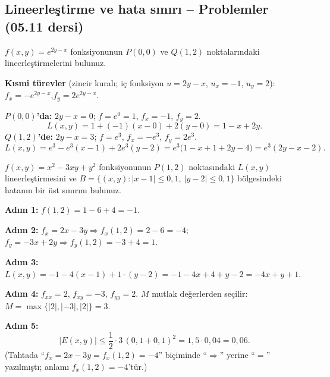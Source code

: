 \subsection{Lineerleştirme ve hata sınırı -- Problemler (05.11 dersi)}

\begin{soru}
$f(x,y)=e^{2y-x}$ fonksiyonunun $P(0,0)$ ve $Q(1,2)$ noktalarındaki lineerleştirmelerini bulunuz.
\end{soru}
\begin{cevap}
\textbf{Kısmi türevler} (zincir kuralı; iç fonksiyon $u=2y-x$, $u_x=-1$, $u_y=2$):
$f_x=-e^{2y-x}$,\quad $f_y=2e^{2y-x}$.

\textbf{$P(0,0)$'da:} $2y-x=0$; $f=e^0=1$, $f_x=-1$, $f_y=2$.
\[ L(x,y)=1+(-1)(x-0)+2(y-0)=1-x+2y . \]
\textbf{$Q(1,2)$'de:} $2y-x=3$; $f=e^3$, $f_x=-e^3$, $f_y=2e^3$.
\[ L(x,y)=e^3-e^3(x-1)+2e^3(y-2)=e^3\big(1-x+1+2y-4\big)=e^3(2y-x-2). \]
\end{cevap}

\begin{soru}
$f(x,y)=x^2-3xy+y^2$ fonksiyonunun $P(1,2)$ noktasındaki $L(x,y)$ lineerleştirmesini ve
$B=\{(x,y):|x-1|\le0{,}1,\ |y-2|\le0{,}1\}$ bölgesindeki hatanın bir üst sınırını bulunuz.
\end{soru}
\begin{cevap}
\textbf{Adım 1:} $f(1,2)=1-6+4=-1$.

\textbf{Adım 2:} $f_x=2x-3y\Rightarrow f_x(1,2)=2-6=-4$;\quad $f_y=-3x+2y\Rightarrow f_y(1,2)=-3+4=1$.

\textbf{Adım 3:} $L(x,y)=-1-4(x-1)+1\cdot(y-2)=-1-4x+4+y-2=-4x+y+1$.

\textbf{Adım 4:} $f_{xx}=2$, $f_{xy}=-3$, $f_{yy}=2$. $M$ mutlak değerlerden seçilir:
$M=\max\{|2|,|-3|,|2|\}=3$.

\textbf{Adım 5:}
\[ |E(x,y)|\le\frac12\cdot3\,(0{,}1+0{,}1)^2=1{,}5\cdot0{,}04=0{,}06 . \]
(Tahtada ``$f_x=2x-3y=f_x(1,2)=-4$'' biçiminde ``$\Rightarrow$'' yerine ``$=$'' yazılmıştı; anlamı
$f_x(1,2)=-4$'tür.)
\end{cevap}

